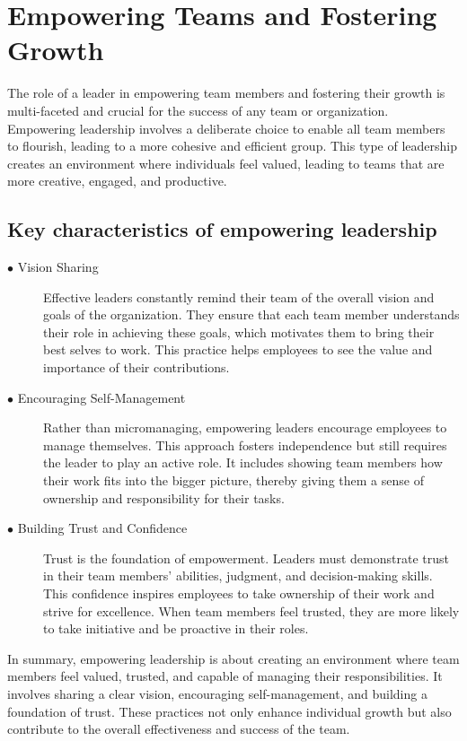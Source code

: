 \documentclass[runningheads]{llncs}
\begin{document}
\section{Empowering Teams and Fostering Growth}

The role of a leader in empowering team members and fostering their growth is multi-faceted and crucial for the success of any team or organization. Empowering leadership involves a deliberate choice to enable all team members to flourish, leading to a more cohesive and efficient group. This type of leadership creates an environment where individuals feel valued, leading to teams that are more creative, engaged, and productive.

\subsection{Key characteristics of empowering leadership}

\begin{description}
 \item [$\bullet$ Vision Sharing] Effective leaders constantly remind their team of the overall vision and goals of the organization. They ensure that each team member understands their role in achieving these goals, which motivates them to bring their best selves to work. This practice helps employees to see the value and importance of their contributions.\\

 \item [$\bullet$ Encouraging Self-Management] Rather than micromanaging, empowering leaders encourage employees to manage themselves. This approach fosters independence but still requires the leader to play an active role. It includes showing team members how their work fits into the bigger picture, thereby giving them a sense of ownership and responsibility for their tasks.\\

 \item [$\bullet$ Building Trust and Confidence] Trust is the foundation of empowerment. Leaders must demonstrate trust in their team members' abilities, judgment, and decision-making skills. This confidence inspires employees to take ownership of their work and strive for excellence. When team members feel trusted, they are more likely to take initiative and be proactive in their roles.\\
\end{description}

In summary, empowering leadership is about creating an environment where team members feel valued, trusted, and capable of managing their responsibilities. It involves sharing a clear vision, encouraging self-management, and building a foundation of trust. These practices not only enhance individual growth but also contribute to the overall effectiveness and success of the team.
\end{document}
